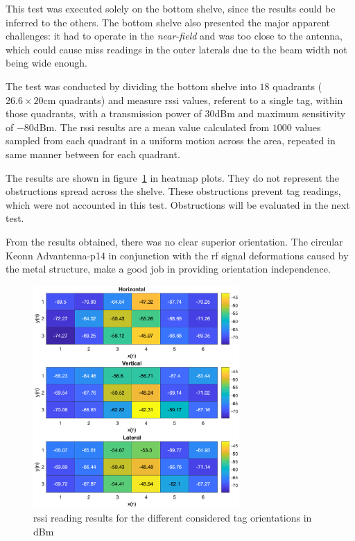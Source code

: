 This test was executed solely on the bottom shelve, since the results could be inferred to the others. The bottom shelve also presented the major apparent challenges: it had to operate in the \emph{near-field} and was too close to the antenna, which could cause miss readings in the outer laterals due to the beam width not being wide enough.

The test was conducted by dividing the bottom shelve into $18$ quadrants ($26.6\times20$cm quadrants) and measure \ac{rssi} values, referent to a single tag, within those quadrants, with a transmission power of $30$dBm and maximum sensitivity of $-80$dBm. The \ac{rssi} results are a mean value calculated from $1000$ values sampled from each quadrant in a uniform motion across the area, repeated in same manner between for each quadrant.

The results are shown in figure~\ref{fig:tagorientationsresults} in heatmap plots.
They do not represent the obstructions spread across the shelve. These obstructions prevent tag readings, which were not accounted in this test. Obstructions will be evaluated in the next test.

From the results obtained, there was no clear superior orientation. The circular Keonn Advantenna-p14 in conjunction with the \ac{rf} signal deformations caused by the metal structure, make a good job in providing orientation independence.

\begin{figure}
    \centering
    \includegraphics[width=0.7\textwidth]{figs/tests/RSSI_shelve.eps}
    \caption{\ac{rssi} reading results for the different considered tag orientations in dBm}
    \label{fig:tagorientationsresults}
\end{figure}

